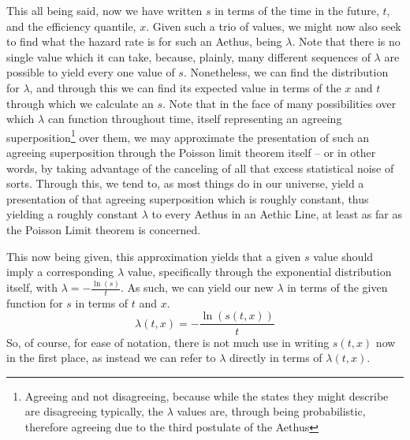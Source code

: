This all being said, now we have written $s$ in terms of the time in the future, $t$, and the efficiency quantile, $x$. Given such a trio of values, we might now also seek to find what the hazard rate is for such an Aethus, being $\lambda$. Note that there is no single value which it can take, because, plainly, many different sequences of $\lambda$ are possible to yield every one value of $s$. Nonetheless, we can find the distribution for $\lambda$, and through this we can find its expected value in terms of the $x$ and $t$ through which we calculate an $s$. Note that in the face of many possibilities over which $\lambda$ can function throughout time, itself representing an agreeing superposition\footnote{Agreeing and not disagreeing, because while the states they might describe are disagreeing typically, the $\lambda$ values are, through being probabilistic, therefore agreeing due to the third postulate of the Aethus} over them, we may approximate the presentation of such an agreeing superposition through the Poisson limit theorem itself -- or in other words, by taking advantage of the canceling of all that excess statistical noise of sorts. Through this, we tend to, as most things do in our universe, yield a presentation of that agreeing superposition which is roughly constant, thus yielding a roughly constant $\lambda$ to every Aethus in an Aethic Line, at least as far as the Poisson Limit theorem is concerned. %

This now being given, this approximation yields that a given $s$ value should imply a corresponding $\lambda$ value, specifically through the exponential distribution itself, with $\lambda = -\frac{\ln \left( s \right)}{t}$. As such, we can yield our new $\lambda$ in terms of the given function for $s$ in terms of $t$ and $x$.
\begin{equation}
    \lambda \! \left( t, x \right) = -\frac{\ln \! \left( s \! \left( t, x \right) \right)}{t}
\end{equation}
So, of course, for ease of notation, there is not much use in writing $s \! \left( t, x \right)$ now in the first place, as instead we can refer to $\lambda$ directly in terms of $\lambda \! \left( t, x \right)$. 

